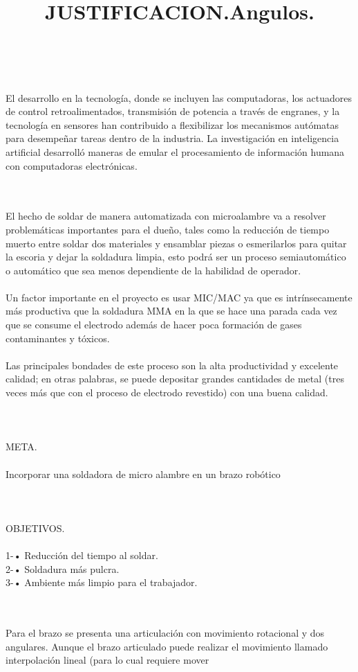 \documentclass[12pt,a4paper]{article}
\begin{document}
\\\\
El desarrollo en la tecnología, donde se incluyen las computadoras, los actuadores de control retroalimentados, transmisión de potencia a través de engranes, y la tecnología en sensores han contribuido a flexibilizar los mecanismos autómatas para desempeñar tareas dentro de la industria. La investigación en inteligencia artificial desarrolló maneras de emular el procesamiento de información humana con computadoras electrónicas.
\newpage
\title{JUSTIFICACION.}
\\\\
El hecho de soldar de manera automatizada con microalambre va a resolver problemáticas importantes para el dueño, tales como la reducción de tiempo muerto entre soldar dos materiales y ensamblar piezas o esmerilarlos para quitar la escoria y dejar la soldadura limpia, esto podrá ser un proceso semiautomático o automático que sea menos dependiente de la habilidad de operador.
\\\\
Un factor importante en el proyecto es usar MIC/MAC ya que es intrínsecamente más productiva que la soldadura MMA en la que se hace una parada cada vez que se consume el electrodo además de hacer poca formación de gases contaminantes y tóxicos.
\\\\
Las principales bondades de este proceso son la alta productividad y excelente calidad; en otras palabras, se puede depositar grandes cantidades de metal (tres veces más que con el proceso de electrodo revestido) con una buena calidad.
\\\\\\\\
META.
\\\\
Incorporar una soldadora de micro alambre en un brazo robótico
\\\\
\\\\
OBJETIVOS.
\\\\
1-•	Reducción del tiempo al soldar.
\\
2-•	Soldadura más pulcra.
\\
3-•	Ambiente más limpio para el trabajador.
\newpage
\title{Angulos.}
\\\\
Para el brazo se presenta una articulación con movimiento rotacional y dos angulares. Aunque el brazo articulado puede realizar el movimiento llamado interpolación lineal (para lo cual requiere mover
\end{document}
